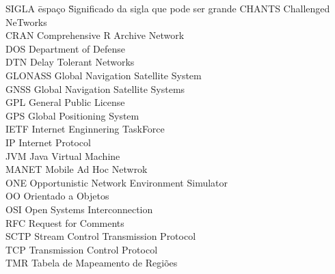 \documentclass[brazil]{abnt-UVV/abnt-uvv}
\begin{document}
\begin{tabbing}
\hspace{0.80cm}SIGLA \= espaço \= Significado da sigla que pode ser grande \kill
\hspace{0.80cm}CHANTS 		\> \> Challenged NeTworks\\
\hspace{0.80cm}CRAN 		\> \> Comprehensive R Archive Network\\
\hspace{0.80cm}DOS 		\> \> Department of Defense\\
\hspace{0.80cm}DTN 		\> \> Delay Tolerant Networks\\
\hspace{0.80cm}GLONASS 		\> \> Global Navigation Satellite System\\
\hspace{0.80cm}GNSS 		\> \> Global Navigation Satellite Systems\\
\hspace{0.80cm}GPL 		\> \> General Public License\\
\hspace{0.80cm}GPS 		\> \> Global Positioning System\\
\hspace{0.80cm}IETF 		\> \> Internet Enginnering TaskForce\\
\hspace{0.80cm}IP 		\> \> Internet Protocol\\
\hspace{0.80cm}JVM 		\> \> Java Virtual Machine\\
\hspace{0.80cm}MANET 		\> \> Mobile Ad Hoc Netwrok\\
\hspace{0.80cm}ONE 		\> \> Opportunistic Network Environment Simulator\\ 
\hspace{0.80cm}OO 		\> \> Orientado a Objetos\\ 
\hspace{0.80cm}OSI 		\> \> Open Systems Interconnection\\
\hspace{0.80cm}RFC 		\> \> Request for Comments\\
\hspace{0.80cm}SCTP 		\> \> Stream Control Transmission Protocol\\
\hspace{0.80cm}TCP 		\> \> Transmission Control Protocol\\
\hspace{0.80cm}TMR 		\> \> Tabela de Mapeamento de Regiões\\


\end{tabbing}
\end{document}
